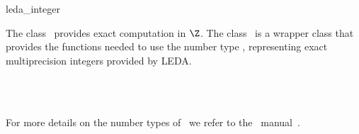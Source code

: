 \ccDefGlobalScope{}
\begin{ccRefClass}{leda_integer}

\ccDefinition

The class \ccRefName\ provides exact computation in $\Z$.
The class \ccRefName\ is a wrapper class that provides the functions 
needed to use the number type , representing exact
multiprecision integers provided by {\sc LEDA}. 


\ccIsModel
{}\\
\\

For more details on the number types of \leda\ we refer to the \leda\
manual~\cite{cgal:mnsu-lum}.

\end{ccRefClass}
